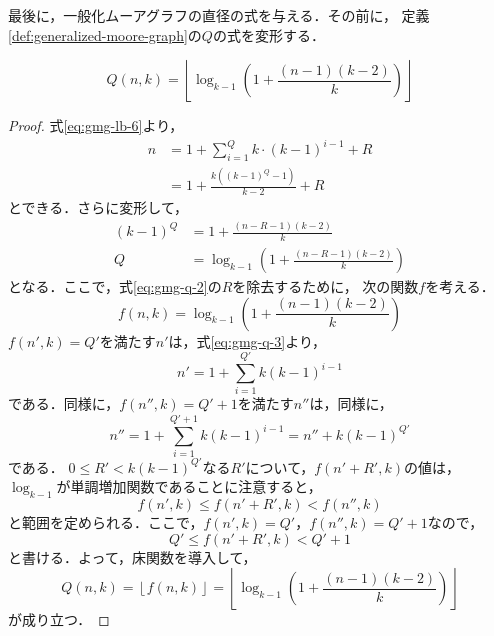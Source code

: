 最後に，一般化ムーアグラフの直径の式を与える．その前に，
定義\ref{def:generalized-moore-graph}の$Q$の式を変形する．
\begin{lemma}
  \label{lem:gmg-q}
  \begin{equation}
    Q(n,k) = \left\lfloor
    \log_{k-1}\left(1+\frac{(n-1)(k-2)}{k}\right)\right\rfloor
  \end{equation}
\end{lemma}
\begin{proof}
  式\ref{eq:gmg-lb-6}より，
  \begin{align}
    n &= 1 + \sum_{i=1}^Qk\cdot(k-1)^{i-1} + R \nonumber\\
    &= 1 + \frac{k\left((k-1)^{Q}-1\right)}{k-2} + R
    \label{eq:gmg-q-1}
  \end{align}
  とできる．さらに変形して，
  \begin{align}
    (k-1)^Q &= 1+\frac{(n-R-1)(k-2)}{k} \nonumber\\
    Q &= \log_{k-1}\left(1+\frac{(n-R-1)(k-2)}{k}\right)
    \label{eq:gmg-q-2}
  \end{align}
  となる．ここで，式\ref{eq:gmg-q-2}の$R$を除去するために，
  次の関数$f$を考える．
  \begin{equation}
    \label{eq:gmg-q-3}
    f(n,k) = \log_{k-1}\left(1+\frac{(n-1)(k-2)}{k}\right)
  \end{equation}
  $f(n',k)=Q'$を満たす$n'$は，式\ref{eq:gmg-q-3}より，
  \[ n'=1+\sum_{i=1}^{Q'}k(k-1)^{i-1} \]
  である．同様に，$f(n'',k)=Q'+1$を満たす$n''$は，同様に，
  \[ n''=1+\sum_{i=1}^{Q'+1}k(k-1)^{i-1} = n''+k(k-1)^{Q'} \]
  である．
  $0\leq R' < k(k-1)^{Q'}$なる$R'$について，$f(n'+R',k)$の値は，
  $\log_{k-1}$が単調増加関数であることに注意すると，
  \[ f(n',k) \leq f(n'+R',k) < f(n'',k) \]
  と範囲を定められる．ここで，$f(n',k)=Q'$，$f(n'',k)=Q'+1$なので，
  \begin{equation}
    \label{eq:gmg-q-4}
    Q' \leq f(n'+R',k) < Q'+1
  \end{equation}
  と書ける．よって，床関数を導入して，
  \[ Q(n,k) = \left\lfloor f(n,k)\right\rfloor
  = \left\lfloor\log_{k-1}\left(1+\frac{(n-1)(k-2)}{k}\right)\right\rfloor \]
  が成り立つ．
\end{proof}

